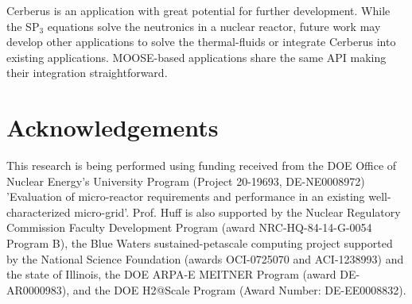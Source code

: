 \documentclass{anstrans}
\begin{document}
Cerberus is an application with great potential for further development.
While the SP$_3$ equations solve the neutronics in a nuclear reactor, future work may develop other applications to solve the thermal-fluids or integrate Cerberus into existing applications.
MOOSE-based applications share the same API making their integration straightforward.


\section{Acknowledgements}

This research is being performed using funding received from the DOE Office of Nuclear Energy's University Program (Project 20-19693, DE-NE0008972) 'Evaluation of micro-reactor requirements and performance in an existing well-characterized micro-grid'.
Prof. Huff is also supported by the Nuclear Regulatory Commission Faculty Development Program (award NRC-HQ-84-14-G-0054 Program B), the Blue Waters sustained-petascale computing project supported by the National Science Foundation (awards OCI-0725070 and ACI-1238993) and the state of Illinois, the DOE ARPA-E MEITNER Program (award DE-AR0000983), and the DOE H2@Scale Program (Award Number: DE-EE0008832).



\end{document}
